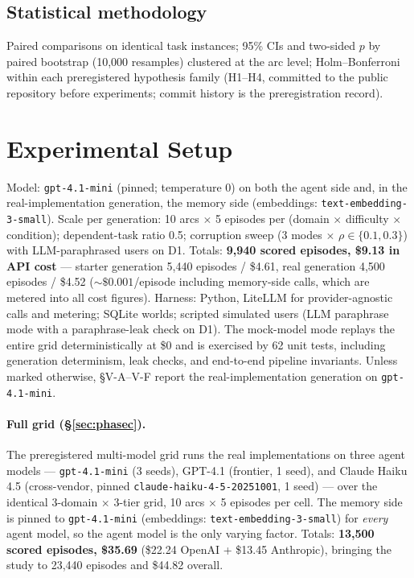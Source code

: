 \documentclass[journal]{IEEEtran}
\begin{document}
\subsection{Statistical methodology}

Paired comparisons on identical task instances; 95\% CIs and two-sided $p$ by
paired bootstrap (10{,}000 resamples) clustered at the arc level;
Holm--Bonferroni within each preregistered hypothesis family (H1--H4,
committed to the public repository before experiments; commit history is the
preregistration record).

\section{Experimental Setup}

Model: \texttt{gpt-4.1-mini} (pinned; temperature 0) on both the agent side
and, in the real-implementation generation, the memory side (embeddings:
\texttt{text-embedding-3-small}). Scale per generation: 10 arcs $\times$ 5
episodes per (domain $\times$ difficulty $\times$ condition); dependent-task
ratio 0.5; corruption sweep (3 modes $\times$ $\rho \in \{0.1, 0.3\}$) with
LLM-paraphrased users on D1. Totals: \textbf{9{,}940 scored episodes, \$9.13
in API cost} --- starter generation 5{,}440 episodes / \$4.61, real
generation 4{,}500 episodes / \$4.52 (${\sim}\$0.001$/episode including
memory-side calls, which are metered into all cost figures). Harness:
Python, LiteLLM for provider-agnostic calls and metering; SQLite worlds;
scripted simulated users (LLM paraphrase mode with a paraphrase-leak check
on D1). The mock-model mode replays the entire grid deterministically at \$0
and is exercised by 62 unit tests, including generation determinism, leak
checks, and end-to-end pipeline invariants. Unless marked otherwise,
\S{}V-A--V-F report the real-implementation generation on
\texttt{gpt-4.1-mini}.

\paragraph{Full grid (\S\ref{sec:phasec}).} The preregistered multi-model
grid runs the real implementations on three agent models ---
\texttt{gpt-4.1-mini} (3 seeds), GPT-4.1 (frontier, 1 seed), and Claude
Haiku 4.5 (cross-vendor, pinned \texttt{claude-haiku-4-5-20251001}, 1
seed) --- over the identical 3-domain $\times$ 3-tier grid, 10 arcs
$\times$ 5 episodes per cell. The memory side is pinned to
\texttt{gpt-4.1-mini} (embeddings: \texttt{text-embedding-3-small}) for
\emph{every} agent model, so the agent model is the only varying factor.
Totals: \textbf{13{,}500 scored episodes, \$35.69} (\$22.24 OpenAI +
\$13.45 Anthropic), bringing the study to 23{,}440 episodes and \$44.82
overall.
\end{document}
